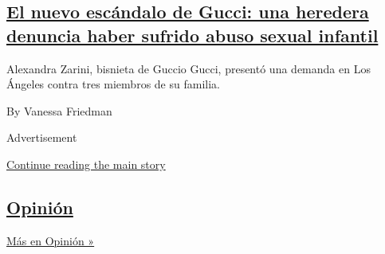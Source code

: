 \begin{enumerate}
{  \subsection{\texorpdfstring{\href{/es/2020/09/10/espanol/estilos-de-vida/gucci-abuso-sexual.html}{El
  nuevo escándalo de Gucci: una heredera denuncia haber sufrido abuso
  sexual
  infantil}}{El nuevo escándalo de Gucci: una heredera denuncia haber sufrido abuso sexual infantil}}\label{el-nuevo-escuxe1ndalo-de-gucci-una-heredera-denuncia-haber-sufrido-abuso-sexual-infantil}}

  Alexandra Zarini, bisnieta de Guccio Gucci, presentó una demanda en
  Los Ángeles contra tres miembros de su familia.

  By Vanessa Friedman
\end{enumerate}

Advertisement

\protect\hyperlink{after-mid1}{Continue reading the main story}

\hypertarget{opiniuxf3n}{%
\subsection{\texorpdfstring{\href{/es/section/opinion}{Opinión}}{Opinión}}\label{opiniuxf3n}}

\href{/es/section/opinion}{Más en Opinión »}

